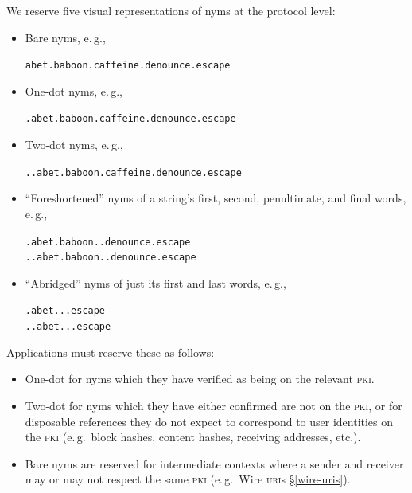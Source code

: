 \documentclass[twoside]{article}
\begin{document}
\noindent
We reserve five visual representations of nyms at the protocol level:

\begin{itemize}[noitemsep,topsep=2pt]

\item
  Bare nyms, e.\,g.,
  \par{\centering
  \texttt{abet.baboon.caffeine.denounce.escape}\par}
\item
  One-dot nyms, e.\,g.,
  \par{\centering
  \texttt{.abet.baboon.caffeine.denounce.escape}\par}
\item
  Two-dot nyms, e.\,g.,
  \par{\centering
  \texttt{..abet.baboon.caffeine.denounce.escape}\par}
\item
  ``Foreshortened'' nyms of a string's first, second, penultimate, and
  final words, e.\,g.,
  \par{\centering
  \texttt{\phantom{~}.abet.baboon..denounce.escape}\\
  \texttt{..abet.baboon..denounce.escape}\par}
\item
  ``Abridged'' nyms of just its first and last words,
  e.\,g.,
  \par{\centering
    \texttt{\phantom{~}.abet...escape}\\
    \texttt{..abet...escape}\par}
\end{itemize}

Applications must reserve these as follows:

\begin{itemize}[noitemsep,topsep=2pt]

\item
  One-dot for nyms which they have verified as being on the relevant
  \textsc{pki}.
\item
  Two-dot for nyms which they have either confirmed are not on the \textsc{pki},
  or for disposable references they do not expect to correspond to user
  identities on the \textsc{pki} (e.\,g.\ block hashes, content hashes, receiving
  addresses, etc.).
\item
  Bare nyms are reserved for intermediate contexts where a sender and
    receiver may or may not respect the same \textsc{pki} (e.\,g.\ Wire \textsc{uri}s \S\ref{wire-uris}).
\end{itemize}
\end{document}
